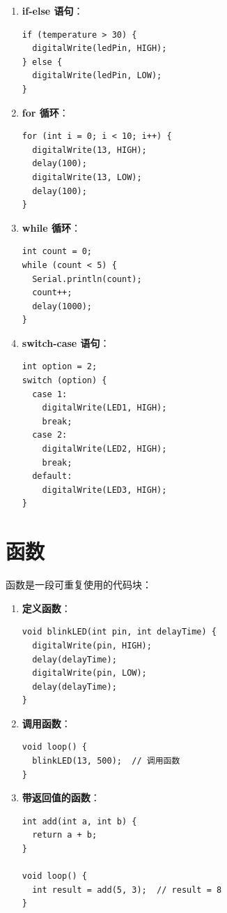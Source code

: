 \documentclass[12pt,UTF8]{ctexbook}
\begin{document}
\begin{enumerate}
    \item \textbf{if-else 语句}：
    \begin{lstlisting}
if (temperature > 30) {
  digitalWrite(ledPin, HIGH);
} else {
  digitalWrite(ledPin, LOW);
}
    \end{lstlisting}
    
    \item \textbf{for 循环}：
    \begin{lstlisting}
for (int i = 0; i < 10; i++) {
  digitalWrite(13, HIGH);
  delay(100);
  digitalWrite(13, LOW);
  delay(100);
}
    \end{lstlisting}
    
    \item \textbf{while 循环}：
    \begin{lstlisting}
int count = 0;
while (count < 5) {
  Serial.println(count);
  count++;
  delay(1000);
}
    \end{lstlisting}
    
    \item \textbf{switch-case 语句}：
    \begin{lstlisting}
int option = 2;
switch (option) {
  case 1:
    digitalWrite(LED1, HIGH);
    break;
  case 2:
    digitalWrite(LED2, HIGH);
    break;
  default:
    digitalWrite(LED3, HIGH);
}
    \end{lstlisting}
\end{enumerate}

\section{函数}

函数是一段可重复使用的代码块：

\begin{enumerate}
    \item \textbf{定义函数}：
    \begin{lstlisting}
void blinkLED(int pin, int delayTime) {
  digitalWrite(pin, HIGH);
  delay(delayTime);
  digitalWrite(pin, LOW);
  delay(delayTime);
}
    \end{lstlisting}
    
    \item \textbf{调用函数}：
    \begin{lstlisting}
void loop() {
  blinkLED(13, 500);  // 调用函数
}
    \end{lstlisting}
    
    \item \textbf{带返回值的函数}：
    \begin{lstlisting}
int add(int a, int b) {
  return a + b;
}

void loop() {
  int result = add(5, 3);  // result = 8
}
    \end{lstlisting}
\end{enumerate}
\end{document}
